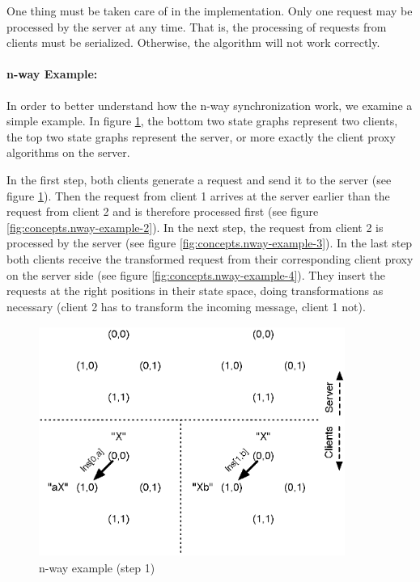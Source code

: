 One thing must be taken care of in the implementation. Only one request may be processed by the server at any time. That is, the processing of requests from clients must be serialized. Otherwise, the algorithm will not work correctly.

\paragraph{n-way Example:} In order to better understand how the n-way synchronization work, we examine a simple example. In figure \ref{fig:concepts.nway-example-1}, the bottom two state graphs represent two clients, the top two state graphs represent the server, or more exactly the client proxy algorithms on the server. 

In the first step, both clients generate a request and send it to the server (see figure \ref{fig:concepts.nway-example-1}). Then the request from client 1 arrives at the server earlier than the request from client 2 and is therefore processed first (see figure \ref{fig:concepts.nway-example-2}). In the next step, the request from client 2 is processed by the server (see figure \ref{fig:concepts.nway-example-3}). In the last step both clients receive the transformed request from their corresponding client proxy on the server side (see figure \ref{fig:concepts.nway-example-4}). They insert the requests at the right positions in their state space, doing transformations as necessary (client 2 has to transform the incoming message, client 1 not).

\begin{figure}[H]
 \centering
 \includegraphics[width=10.0cm,height=7.54cm]{../../images/concepts_nway-example-1.eps}
 \caption{n-way example (step 1)}
 \label{fig:concepts.nway-example-1}
\end{figure}

